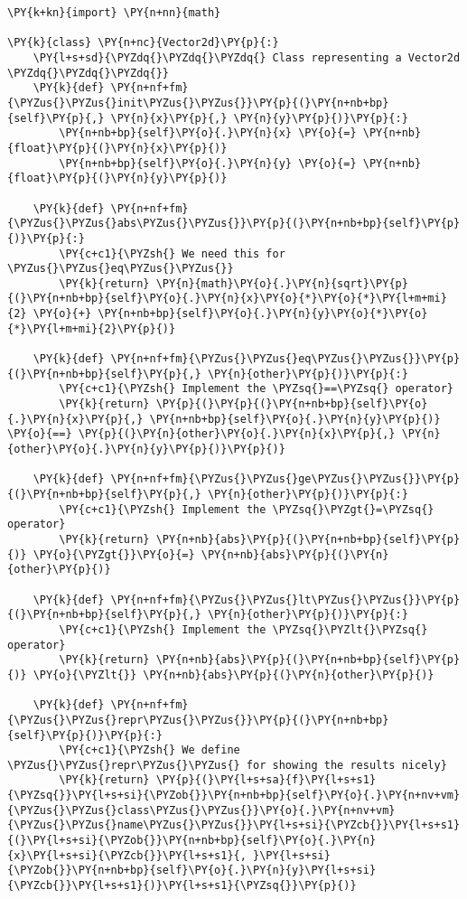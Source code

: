 \begin{Verbatim}[label=\makebox{\url{https://github.com/lucabaldini/cmepda/tree/master/slides/latex/snippets/vector2d\_comparable.py}},commandchars=\\\{\}]
\PY{k+kn}{import} \PY{n+nn}{math}

\PY{k}{class} \PY{n+nc}{Vector2d}\PY{p}{:}
    \PY{l+s+sd}{\PYZdq{}\PYZdq{}\PYZdq{} Class representing a Vector2d \PYZdq{}\PYZdq{}\PYZdq{}}
    \PY{k}{def} \PY{n+nf+fm}{\PYZus{}\PYZus{}init\PYZus{}\PYZus{}}\PY{p}{(}\PY{n+nb+bp}{self}\PY{p}{,} \PY{n}{x}\PY{p}{,} \PY{n}{y}\PY{p}{)}\PY{p}{:}
        \PY{n+nb+bp}{self}\PY{o}{.}\PY{n}{x} \PY{o}{=} \PY{n+nb}{float}\PY{p}{(}\PY{n}{x}\PY{p}{)}
        \PY{n+nb+bp}{self}\PY{o}{.}\PY{n}{y} \PY{o}{=} \PY{n+nb}{float}\PY{p}{(}\PY{n}{y}\PY{p}{)}

    \PY{k}{def} \PY{n+nf+fm}{\PYZus{}\PYZus{}abs\PYZus{}\PYZus{}}\PY{p}{(}\PY{n+nb+bp}{self}\PY{p}{)}\PY{p}{:}
        \PY{c+c1}{\PYZsh{} We need this for \PYZus{}\PYZus{}eq\PYZus{}\PYZus{}}
        \PY{k}{return} \PY{n}{math}\PY{o}{.}\PY{n}{sqrt}\PY{p}{(}\PY{n+nb+bp}{self}\PY{o}{.}\PY{n}{x}\PY{o}{*}\PY{o}{*}\PY{l+m+mi}{2} \PY{o}{+} \PY{n+nb+bp}{self}\PY{o}{.}\PY{n}{y}\PY{o}{*}\PY{o}{*}\PY{l+m+mi}{2}\PY{p}{)}

    \PY{k}{def} \PY{n+nf+fm}{\PYZus{}\PYZus{}eq\PYZus{}\PYZus{}}\PY{p}{(}\PY{n+nb+bp}{self}\PY{p}{,} \PY{n}{other}\PY{p}{)}\PY{p}{:}
        \PY{c+c1}{\PYZsh{} Implement the \PYZsq{}==\PYZsq{} operator}
        \PY{k}{return} \PY{p}{(}\PY{p}{(}\PY{n+nb+bp}{self}\PY{o}{.}\PY{n}{x}\PY{p}{,} \PY{n+nb+bp}{self}\PY{o}{.}\PY{n}{y}\PY{p}{)} \PY{o}{==} \PY{p}{(}\PY{n}{other}\PY{o}{.}\PY{n}{x}\PY{p}{,} \PY{n}{other}\PY{o}{.}\PY{n}{y}\PY{p}{)}\PY{p}{)}

    \PY{k}{def} \PY{n+nf+fm}{\PYZus{}\PYZus{}ge\PYZus{}\PYZus{}}\PY{p}{(}\PY{n+nb+bp}{self}\PY{p}{,} \PY{n}{other}\PY{p}{)}\PY{p}{:}
        \PY{c+c1}{\PYZsh{} Implement the \PYZsq{}\PYZgt{}=\PYZsq{} operator}
        \PY{k}{return} \PY{n+nb}{abs}\PY{p}{(}\PY{n+nb+bp}{self}\PY{p}{)} \PY{o}{\PYZgt{}}\PY{o}{=} \PY{n+nb}{abs}\PY{p}{(}\PY{n}{other}\PY{p}{)}

    \PY{k}{def} \PY{n+nf+fm}{\PYZus{}\PYZus{}lt\PYZus{}\PYZus{}}\PY{p}{(}\PY{n+nb+bp}{self}\PY{p}{,} \PY{n}{other}\PY{p}{)}\PY{p}{:}
        \PY{c+c1}{\PYZsh{} Implement the \PYZsq{}\PYZlt{}\PYZsq{} operator}
        \PY{k}{return} \PY{n+nb}{abs}\PY{p}{(}\PY{n+nb+bp}{self}\PY{p}{)} \PY{o}{\PYZlt{}} \PY{n+nb}{abs}\PY{p}{(}\PY{n}{other}\PY{p}{)}

    \PY{k}{def} \PY{n+nf+fm}{\PYZus{}\PYZus{}repr\PYZus{}\PYZus{}}\PY{p}{(}\PY{n+nb+bp}{self}\PY{p}{)}\PY{p}{:}
        \PY{c+c1}{\PYZsh{} We define \PYZus{}\PYZus{}repr\PYZus{}\PYZus{} for showing the results nicely}
        \PY{k}{return} \PY{p}{(}\PY{l+s+sa}{f}\PY{l+s+s1}{\PYZsq{}}\PY{l+s+si}{\PYZob{}}\PY{n+nb+bp}{self}\PY{o}{.}\PY{n+nv+vm}{\PYZus{}\PYZus{}class\PYZus{}\PYZus{}}\PY{o}{.}\PY{n+nv+vm}{\PYZus{}\PYZus{}name\PYZus{}\PYZus{}}\PY{l+s+si}{\PYZcb{}}\PY{l+s+s1}{(}\PY{l+s+si}{\PYZob{}}\PY{n+nb+bp}{self}\PY{o}{.}\PY{n}{x}\PY{l+s+si}{\PYZcb{}}\PY{l+s+s1}{, }\PY{l+s+si}{\PYZob{}}\PY{n+nb+bp}{self}\PY{o}{.}\PY{n}{y}\PY{l+s+si}{\PYZcb{}}\PY{l+s+s1}{)}\PY{l+s+s1}{\PYZsq{}}\PY{p}{)}
\end{Verbatim}